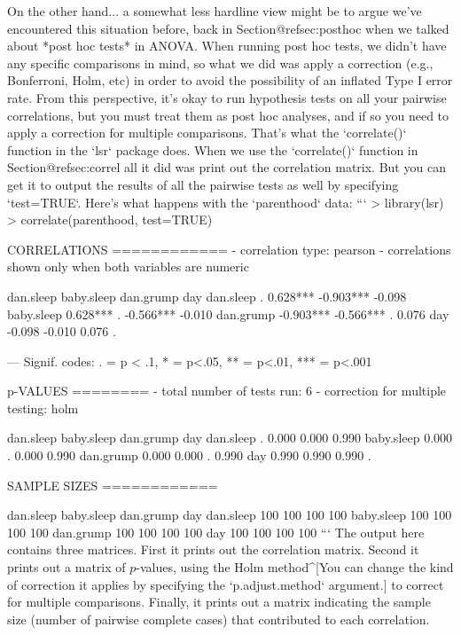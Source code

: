 On the other hand... a somewhat less hardline view might be to argue we've encountered this situation before, back in Section@refsec:posthoc when we talked about *post hoc tests* in ANOVA. When running post hoc tests, we didn't have any specific comparisons in mind, so what we did was apply a correction (e.g., Bonferroni, Holm, etc) in order to avoid the possibility of an inflated Type I error rate. From this perspective, it's okay to run hypothesis tests on all your pairwise correlations, but you must treat them as post hoc analyses, and if so you need to apply a correction for multiple comparisons. That's what the `correlate()` function in the `lsr` package does. When we use the `correlate()` function in Section@refsec:correl all it did was print out the correlation matrix. But you can get it to output the results of all the pairwise tests as well by specifying `test=TRUE`. Here's what happens with the `parenthood` data:
```
> library(lsr)
> correlate(parenthood, test=TRUE)

CORRELATIONS
============
- correlation type:  pearson 
- correlations shown only when both variables are numeric

           dan.sleep    baby.sleep    dan.grump       day   
dan.sleep          .         0.628***    -0.903*** -0.098   
baby.sleep     0.628***          .       -0.566*** -0.010   
dan.grump     -0.903***     -0.566***         .     0.076   
day           -0.098        -0.010        0.076         .   

---
Signif. codes: . = p < .1, * = p<.05, ** = p<.01, *** = p<.001


p-VALUES
========
- total number of tests run:  6 
- correction for multiple testing:  holm 

           dan.sleep baby.sleep dan.grump   day
dan.sleep          .      0.000     0.000 0.990
baby.sleep     0.000          .     0.000 0.990
dan.grump      0.000      0.000         . 0.990
day            0.990      0.990     0.990     .


SAMPLE SIZES
============

           dan.sleep baby.sleep dan.grump day
dan.sleep        100        100       100 100
baby.sleep       100        100       100 100
dan.grump        100        100       100 100
day              100        100       100 100
```
The output here contains three matrices. First it prints out the correlation matrix. Second it prints out a matrix of $p$-values, using the Holm method^[You can change the kind of correction it applies by specifying the `p.adjust.method` argument.] to correct for multiple comparisons. Finally, it prints out a matrix indicating the sample size (number of pairwise complete cases) that contributed to each correlation. 

